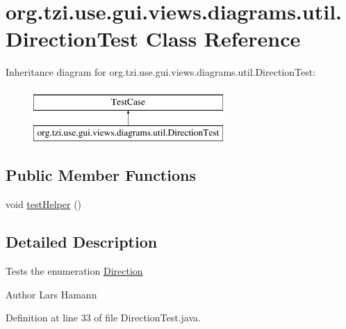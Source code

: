\hypertarget{classorg_1_1tzi_1_1use_1_1gui_1_1views_1_1diagrams_1_1util_1_1_direction_test}{\section{org.\-tzi.\-use.\-gui.\-views.\-diagrams.\-util.\-Direction\-Test Class Reference}
\label{classorg_1_1tzi_1_1use_1_1gui_1_1views_1_1diagrams_1_1util_1_1_direction_test}
}
Inheritance diagram for org.\-tzi.\-use.\-gui.\-views.\-diagrams.\-util.\-Direction\-Test\-:\begin{figure}[H]
\begin{center}
\leavevmode
\includegraphics[height=2.000000cm]{classorg_1_1tzi_1_1use_1_1gui_1_1views_1_1diagrams_1_1util_1_1_direction_test}
\end{center}
\end{figure}
\subsection*{Public Member Functions}
\begin{DoxyCompactItemize}
\item 
void \hyperlink{classorg_1_1tzi_1_1use_1_1gui_1_1views_1_1diagrams_1_1util_1_1_direction_test_aeffe3c376dd99b9ff48f9e897683d295}{test\-Helper} ()
\end{DoxyCompactItemize}


\subsection{Detailed Description}
Tests the enumeration \hyperlink{enumorg_1_1tzi_1_1use_1_1gui_1_1views_1_1diagrams_1_1util_1_1_direction}{Direction} \begin{DoxyAuthor}{Author}
Lars Hamann 
\end{DoxyAuthor}


Definition at line 33 of file Direction\-Test.\-java.



